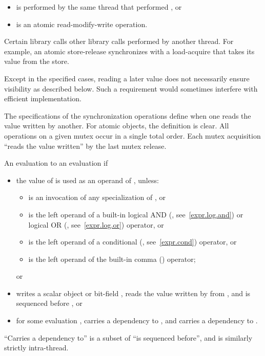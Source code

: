 \begin{itemize}
\item is performed by the same thread that performed , or
\item is an atomic read-modify-write operation.
\end{itemize}

\pnum
Certain library calls  other library calls performed by
another thread. For example, an atomic store-release synchronizes with a
load-acquire that takes its value from the store.
\begin{note} Except in the specified cases, reading a later value does not
necessarily ensure visibility as described below. Such a requirement would
sometimes interfere with efficient implementation. \end{note} \begin{note} The
specifications of the synchronization operations define when one reads the value
written by another. For atomic objects, the definition is clear. All operations
on a given mutex occur in a single total order. Each mutex acquisition ``reads
the value written'' by the last mutex release. \end{note}

\pnum
An evaluation   to an evaluation  if

\begin{itemize}
\item
the value of  is used as an operand of , unless:
\begin{itemize}
\item
{} is an invocation of any specialization of
, or
\item
{} is the left operand of a built-in logical AND (\tcode{\&\&},
see~\ref{expr.log.and}) or logical OR (\tcode{||}, see~\ref{expr.log.or})
operator, or
\item
{} is the left operand of a conditional (, see~\ref{expr.cond})
operator, or
\item
{} is the left operand of the built-in comma (\tcode{,})
operator; \end{itemize} or
\item
{} writes a scalar object or bit-field ,  reads the value
written by  from , and  is sequenced before , or
\item
for some evaluation ,  carries a dependency to , and
 carries a dependency to .
\end{itemize}
\begin{note} ``Carries a dependency to'' is a subset of ``is sequenced before'',
and is similarly strictly intra-thread. \end{note}

